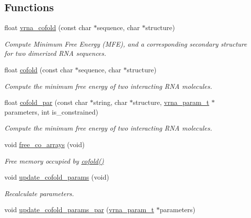 \subsection*{Functions}
\begin{DoxyCompactItemize}
\item 
float \hyperlink{group__mfe__cofold_ga9ef3a297201dbf838a8daff2b45c0c82}{vrna\+\_\+cofold} (const char $\ast$sequence, char $\ast$structure)
\begin{DoxyCompactList}\small\item\em Compute Minimum Free Energy (M\+FE), and a corresponding secondary structure for two dimerized R\+NA sequences. \end{DoxyCompactList}\item 
float \hyperlink{group__mfe__cofold_gabc8517f22cfe70595ee81fc837910d52}{cofold} (const char $\ast$sequence, char $\ast$structure)
\begin{DoxyCompactList}\small\item\em Compute the minimum free energy of two interacting R\+NA molecules. \end{DoxyCompactList}\item 
float \hyperlink{group__mfe__cofold_ga7612cfeeb1b793f1e4179b1eb53df1f3}{cofold\+\_\+par} (const char $\ast$string, char $\ast$structure, \hyperlink{group__energy__parameters_ga8a69ca7d787e4fd6079914f5343a1f35}{vrna\+\_\+param\+\_\+t} $\ast$parameters, int is\+\_\+constrained)
\begin{DoxyCompactList}\small\item\em Compute the minimum free energy of two interacting R\+NA molecules. \end{DoxyCompactList}\item 
void \hyperlink{group__mfe__cofold_gaafb33d7473eb9af9d1b168ca8761c41a}{free\+\_\+co\+\_\+arrays} (void)
\begin{DoxyCompactList}\small\item\em Free memory occupied by \hyperlink{group__mfe__cofold_gabc8517f22cfe70595ee81fc837910d52}{cofold()} \end{DoxyCompactList}\item 
void \hyperlink{group__mfe__cofold_ga4fcbf34e77b99bfbb2333d2ab0c41a57}{update\+\_\+cofold\+\_\+params} (void)
\begin{DoxyCompactList}\small\item\em Recalculate parameters. \end{DoxyCompactList}\item 
void \hyperlink{group__mfe__cofold_gaaadbd28b4e428710529ab4098fdacad3}{update\+\_\+cofold\+\_\+params\+\_\+par} (\hyperlink{group__energy__parameters_ga8a69ca7d787e4fd6079914f5343a1f35}{vrna\+\_\+param\+\_\+t} $\ast$parameters)

\end{DoxyCompactItemize}
